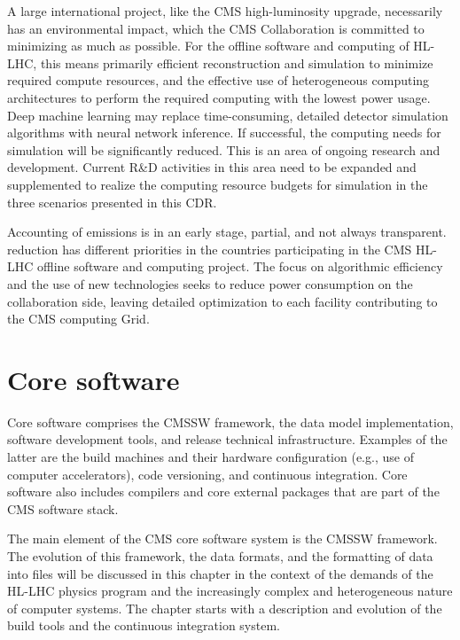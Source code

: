 A large international project, like the CMS high-luminosity upgrade, necessarily has an environmental impact, which the CMS Collaboration is committed to minimizing as much as possible. For the offline software and computing of \gls{HL-LHC}, this means primarily efficient reconstruction and simulation to minimize required compute resources, and the effective use of heterogeneous computing architectures to perform the required computing with the lowest power usage. Deep machine learning may replace time-consuming, detailed detector simulation algorithms with neural network inference. If successful, the computing needs for simulation will be significantly reduced. This is an area of ongoing research and development. Current R\&D activities in this area need to be expanded and supplemented to realize the computing resource budgets for simulation in the three scenarios presented in this CDR.

Accounting of \COTwo emissions is in an early stage, partial, and not always transparent. \COTwo reduction has different priorities in the countries participating in the CMS \gls{HL-LHC} offline software and computing project. The focus on algorithmic efficiency and the use of new technologies seeks to reduce power consumption on the collaboration side, leaving detailed \COTwo optimization to each facility contributing to the CMS computing Grid.

\clearpage

%
%
% 
\section{Core software}
\label{sec:coresoft}

Core software comprises the \gls{CMSSW} framework, the data model implementation, software development tools, and release technical infrastructure. Examples of the latter are the build machines and their hardware configuration (e.g., use of computer accelerators), code versioning, and continuous integration. Core software also includes compilers and core external packages that are part of the CMS software stack.

The main element of the CMS core software system is the \gls{CMSSW} framework. The evolution of this framework, the data formats, and the formatting of data into files will be discussed in this chapter in the context of the demands of the \gls{HL-LHC} physics program and the increasingly complex and heterogeneous nature of computer systems. The chapter starts with a description and evolution of the build tools and the continuous integration system.

